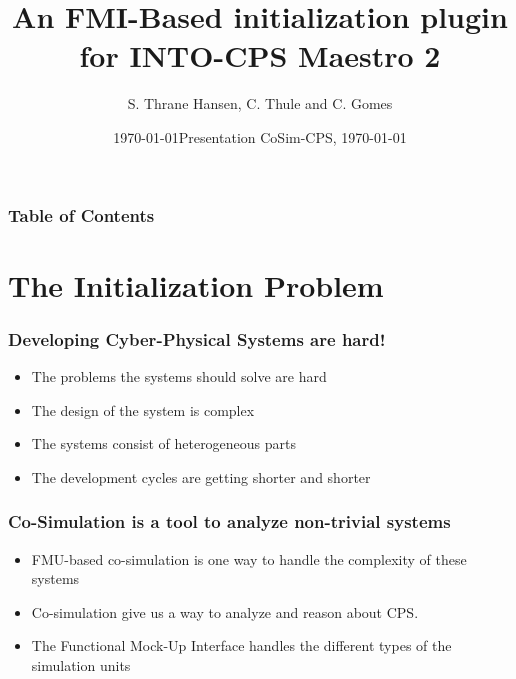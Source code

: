 \documentclass{beamer}
\title[FMI-Based initialization plugin for Maestro 2] %
{An FMI-Based initialization plugin for INTO-CPS Maestro 2}
\date{\today}
\author[Thrane Hansen, Simon] %
{S. Thrane Hansen, C. Thule and C. Gomes}
\institute[AU] %
{
  Department of Engineering\\
  Aarhus University
}
\date[AU 2020] %
{Presentation CoSim-CPS, \today}
\begin{document}
\frame{\titlepage}

\begin{frame}
\frametitle{Table of Contents}
\tableofcontents
\end{frame}

\section{The Initialization Problem}
\begin{frame}
\frametitle{Developing Cyber-Physical Systems are hard!}
\begin{itemize}
    \item The problems the systems should solve are hard
    \item The design of the system is complex
    \item The systems consist of heterogeneous parts
    \item The development cycles are getting shorter and shorter
\end{itemize}

\end{frame}

\begin{frame}
\frametitle{Co-Simulation is a tool to analyze \textbf{non-trivial} systems}
\begin{itemize}
    \item FMU-based co-simulation is one way to handle the complexity of these systems
    \item Co-simulation give us a way to analyze and reason about CPS.
    \item The Functional Mock-Up Interface handles the different types of the simulation units
\end{itemize}

\end{frame}
\end{document}
